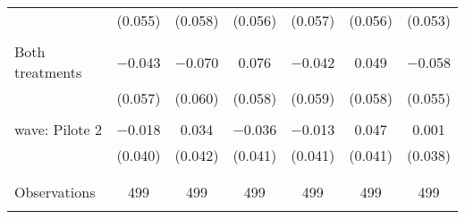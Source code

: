 \begin{tabular}{@{\extracolsep{5pt}}lcccccc}
  & (0.055) & (0.058) & (0.056) & (0.057) & (0.056) & (0.053) \\ 
  & & & & & & \\ 
 Both treatments & $-$0.043 & $-$0.070 & 0.076 & $-$0.042 & 0.049 & $-$0.058 \\ 
  & (0.057) & (0.060) & (0.058) & (0.059) & (0.058) & (0.055) \\ 
  & & & & & & \\ 
 wave: Pilote 2 & $-$0.018 & 0.034 & $-$0.036 & $-$0.013 & 0.047 & 0.001 \\ 
  & (0.040) & (0.042) & (0.041) & (0.041) & (0.041) & (0.038) \\ 
  & & & & & & \\ 
\hline \\[-1.8ex] 

Observations & 499 & 499 & 499 & 499 & 499 & 499 \\ 
\hline 
\hline \\[-1.8ex] 
\end{tabular} 